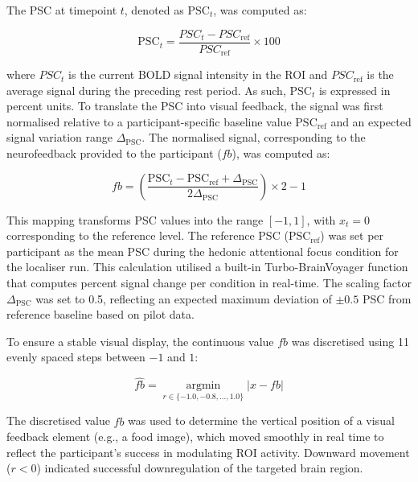 \documentclass[]{imag-ms-template}
\begin{document}
The PSC at timepoint $t$, denoted as $\mathrm{PSC}_t$, was computed as:

\begin{equation}
\mathrm{PSC}_t = \frac{PSC_t - PSC_{\mathrm{ref}}}{PSC_{\mathrm{ref}}} \times 100
\end{equation}

where $PSC_t$ is the current BOLD signal intensity in the ROI and $PSC_{\mathrm{ref}}$ is the average signal during the preceding rest period. As such, $\mathrm{PSC}_t$ is expressed in percent units. To translate the PSC into visual feedback, the signal was first normalised relative to a participant-specific baseline value $\mathrm{PSC}_{\mathrm{ref}}$ and an expected signal variation range $\Delta_{\mathrm{PSC}}$. The normalised signal, corresponding to the neurofeedback provided to the participant ($fb$), was computed as:

\begin{equation}
fb = \left( \frac{\mathrm{PSC}_t - \mathrm{PSC}_{\mathrm{ref}} + \Delta_{\mathrm{PSC}}}{2 \Delta_{\mathrm{PSC}}} \right) \times 2 - 1
\end{equation}

This mapping transforms PSC values into the range $[-1, 1]$, with $x_t = 0$ corresponding to the reference level. The reference PSC ($\mathrm{PSC}_{\mathrm{ref}}$) was set per participant as the mean PSC during the hedonic attentional focus condition for the localiser run. This calculation utilised a built-in Turbo-BrainVoyager function that computes percent signal change per condition in real-time. The scaling factor $\Delta_{\mathrm{PSC}}$ was set to 0.5, reflecting an expected maximum deviation of $\pm 0.5$ PSC from reference baseline based on pilot data. %

To ensure a stable visual display, the continuous value $fb$ was discretised using 11 evenly spaced steps between $-1$ and $1$:

\begin{equation}
\hat{fb} = \underset{r \in \{-1.0, -0.8, \dots, 1.0\}}{\operatorname{argmin}} \left| x - fb \right|
\end{equation}

The discretised value $\hat{fb}$ was used to determine the vertical position of a visual feedback element (e.g., a food image), which moved smoothly in real time to reflect the participant’s success in modulating ROI activity. Downward movement ($r <0$) indicated successful downregulation of the targeted brain region.
\end{document}
